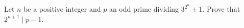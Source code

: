 Let $n$ be a positive integer and $p$ an odd prime dividing $3^{2^n}+1$. Prove that $2^{n+1}\mid p-1$.
